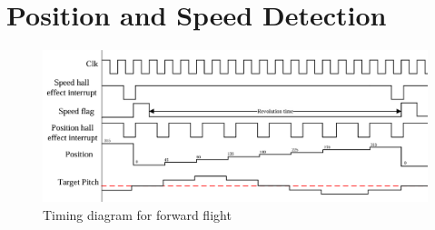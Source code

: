         \section{Position and Speed Detection}
        \begin{figure} [h]               
            \centering
            \includegraphics*[width = \textwidth]{figs/Software/Hall_Effect_timing.png}
            \caption{Timing diagram for forward flight}
            \label{fig: hall_effect_timing}
        \end{figure} 

